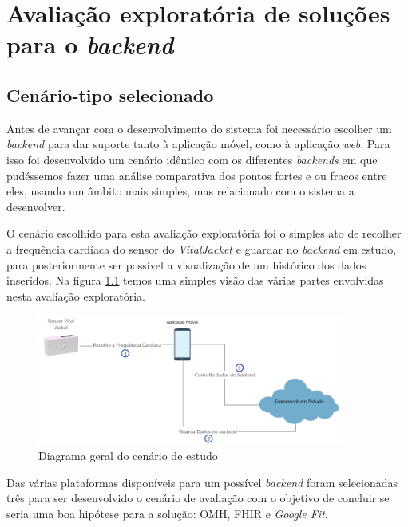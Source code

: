\chapter{Avaliação exploratória de soluções para o \textit{backend}}

\section{Cenário-tipo selecionado}

Antes de avançar com o desenvolvimento do sistema foi necessário escolher um \textit{backend} para dar suporte tanto à aplicação móvel, como à aplicação \textit{web}. Para isso foi desenvolvido um cenário idêntico com os diferentes \textit{backends} em que pudéssemos fazer uma análise comparativa dos pontos fortes e ou fracos entre eles, usando um âmbito mais simples, mas relacionado com o sistema a desenvolver. \par 
O cenário escolhido para esta avaliação exploratória foi o simples ato de recolher a frequência cardíaca do sensor do \textit{VitalJacket} e guardar no \textit{backend} em estudo, para posteriormente ser possível a visualização de um histórico dos dados inseridos. Na figura \ref{f:study-overview} temos uma simples visão das várias partes envolvidas nesta avaliação exploratória.

\begin{figure}[H]
  \centering
  \includegraphics[width=0.9\textwidth]{imgs/study-overview.png}
  \caption[Diagrama geral do cenário de estudo]{Diagrama geral do cenário de estudo}
  
  \label{f:study-overview}
\end{figure}

Das várias plataformas disponíveis para um possível \textit{backend} foram selecionadas três para ser desenvolvido o cenário de avaliação com o objetivo de concluir se seria uma boa hipótese para a solução: \gls{OMH}, \gls{FHIR} e \textit{Google Fit}. \par

